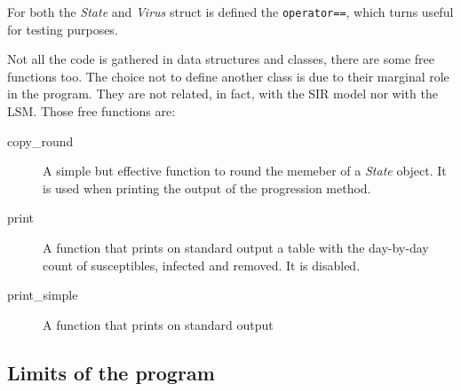 For both the \emph{State} and \emph{Virus} struct is defined the \verb!operator==!, which turns useful for testing purposes.

Not all the code is gathered in data structures and classes, there are some free functions too. The choice not to define another class is due to their marginal role in the program. They are not related, in fact, with the SIR model nor with the LSM. Those free functions are:
\begin{description}
\item[copy\_round] A simple but effective function to round the memeber of a \emph{State} object. It is used when printing the output of the progression method.
\item[print] A function that prints on standard output a table with the day-by-day count of susceptibles, infected and removed. It is disabled.
\item[print\_simple] A function that prints on standard output
\end{description}

\subsection{Limits of the program}


